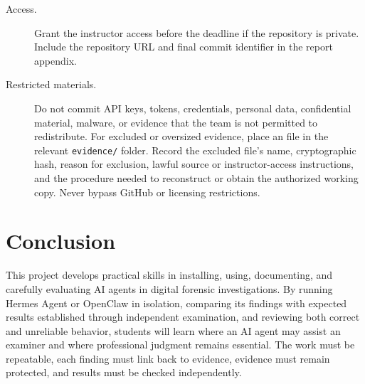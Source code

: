 \documentclass[12pt,letterpaper]{article}
\begin{document}
\begin{description}
    \item[Access.] Grant the instructor access before the deadline if the repository is private. Include the repository URL and final commit identifier in the report appendix.
    \item[Restricted materials.] Do not commit API keys, tokens, credentials, personal data, confidential material, malware, or evidence that the team is not permitted to redistribute. For excluded or oversized evidence, place an  file in the relevant \texttt{evidence/} folder. Record the excluded file's name, cryptographic hash, reason for exclusion, lawful source or instructor-access instructions, and the procedure needed to reconstruct or obtain the authorized working copy. Never bypass GitHub or licensing restrictions.
\end{description}

\clearpage
\section{Conclusion}
This project develops practical skills in installing, using, documenting, and carefully evaluating AI agents in digital forensic investigations. By running Hermes Agent or OpenClaw in isolation, comparing its findings with expected results established through independent examination, and reviewing both correct and unreliable behavior, students will learn where an AI agent may assist an examiner and where professional judgment remains essential. The work must be repeatable, each finding must link back to evidence, evidence must remain protected, and results must be checked independently.
\end{document}
